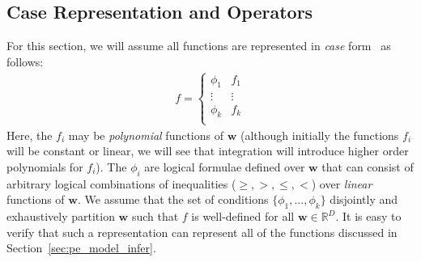 \documentclass{article} %
\newcommand{\R}{\mathbb{R}}
\renewcommand{\vec}[1]{\mathbf{#1}}
\begin{document}
\subsection{Case Representation and Operators}

For this section, we will assume all functions
are represented in \emph{case} form~\cite{uai11} as follows:
{%
\begin{align}
f = 
\begin{cases}
  \phi_1 & f_1 \\ 
  \vdots & \vdots \\ 
  \phi_k & f_k \\ 
\end{cases} \label{eq:case}
\end{align}
} Here, the $f_i$ may be \emph{polynomial} functions of $\vec{w}$ (although
initially the functions $f_i$ will be constant or linear, we will see
that integration will introduce higher order polynomials for $f_i$).  The
$\phi_i$ are logical formulae defined over $\vec{w}$ that can consist
of arbitrary logical combinations of inequalities ($\geq,>,\leq,<$)
over \emph{linear} functions of $\vec{w}$.  We assume that the set of
conditions $\{ \phi_1,\ldots,\phi_k \}$ disjointly and exhaustively
partition $\vec{w}$ such that $f$ is well-defined for all $\vec{w} \in
\R^D$.  It is easy to verify that such a representation can represent
all of the functions discussed in Section~\ref{sec:pe_model_infer}.
\end{document}
